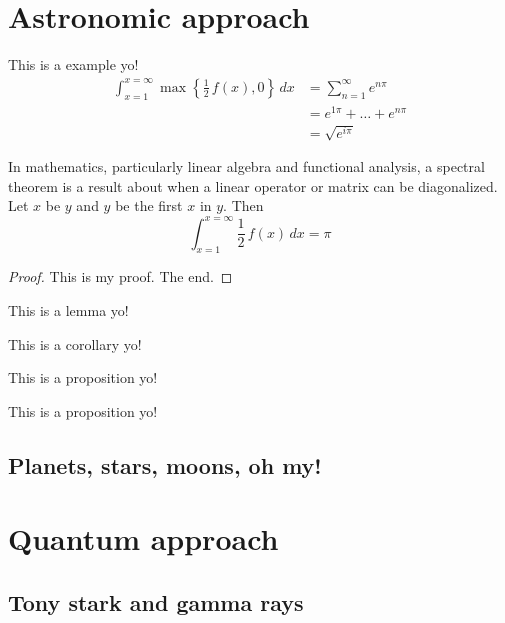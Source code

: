 \documentclass{notes}
\begin{document}
  \section{Astronomic approach}
  \lipsum[7-9]
  \begin{fig}%
  \end{fig}
  \lipsum[10-10]
  \begin{example}
    This is a example yo!%
    \lipsum[5]
    \begin{align*}
      \int_{x=1}^{x=\infty}\max\left\{\frac12\,f(x), 0\right\}\,dx &= \sum_{n=1}^{\infty}e^{n\pi} \\
      &= e^{1\pi} + \ldots + e^{n\pi} \\
      &= \sqrt{e^{i\pi}}
    \end{align*}
    \lipsum[2]
  \end{example}
  \begin{theorem}
    In mathematics, particularly linear algebra and functional analysis, a spectral theorem is a result about when a linear operator or matrix can be diagonalized. Let $x$ be $y$ and $y$ be the first $x$ in $y$. Then
    $$\int_{x=1}^{x=\infty}\frac12\,f(x)\,dx = \pi$$%
  \end{theorem}
  \begin{proof}
    This is my proof. The end.
  \end{proof}
  \begin{lemma}
    This is a lemma yo!%
  \end{lemma}
  \begin{corollary}
    This is a corollary yo!%
  \end{corollary}
  \begin{proposition}
    This is a proposition yo!%
  \end{proposition}
  \begin{remark}
    This is a proposition yo!%
  \end{remark}
  \lipsum[10-10]
  \subsection{Planets, stars, moons, oh my!}
  \lipsum[11-13]
  \section{Quantum approach}
  \lipsum[14-16]
  \subsection{Tony stark and gamma rays}
  \lipsum[17-18]
\end{document}
